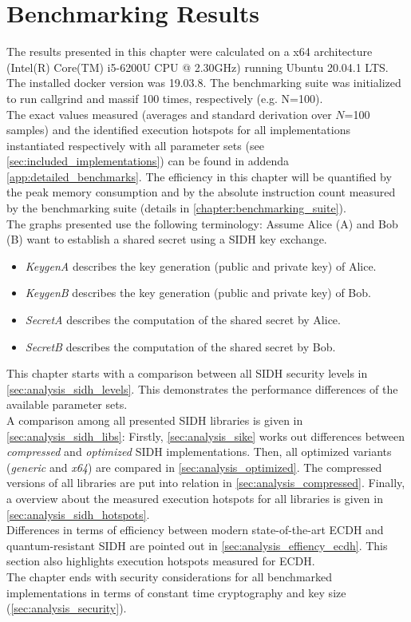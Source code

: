 \chapter{Benchmarking Results}\label{chapter:analysis}

The results presented in this chapter were calculated on a x64 architecture (Intel(R) Core(TM) i5-6200U CPU @ 2.30GHz) running Ubuntu 20.04.1 LTS. The installed docker version was 19.03.8. The benchmarking suite was initialized to run callgrind and massif 100 times, respectively (e.g. N=100).\\
The exact values measured (averages and standard derivation over $N$=100 samples) and the identified execution hotspots for all implementations instantiated respectively with all parameter sets (see \autoref{sec:included_implementations}) can be found in addenda \ref{app:detailed_benchmarks}. The efficiency in this chapter will be quantified by the peak memory consumption and by the absolute instruction count measured by the benchmarking suite (details in \autoref{chapter:benchmarking_suite}). \\
The graphs presented use the following terminology:
Assume Alice (A) and Bob (B) want to establish a shared secret using a SIDH key exchange.
\begin{itemize}
\item \textit{KeygenA} describes the key generation (public and private key) of Alice.
\item \textit{KeygenB} describes the key generation (public and private key) of Bob.
\item \textit{SecretA} describes the computation of the shared secret by Alice.
\item \textit{SecretB} describes the computation of the shared secret by Bob.
\end{itemize}
This chapter starts with a comparison between all SIDH security levels in \autoref{sec:analysis_sidh_levels}. This demonstrates the performance differences of the available parameter sets. \\
A comparison among all presented SIDH libraries is given in \autoref{sec:analysis_sidh_libs}: Firstly, \ref{sec:analysis_sike} works out differences between \textit{compressed} and \textit{optimized} SIDH implementations. Then, all optimized variants (\textit{generic} and \textit{x64}) are compared in \ref{sec:analysis_optimized}. The compressed versions of all libraries are put into relation in \ref{sec:analysis_compressed}. Finally, a overview about the measured execution hotspots for all libraries is given in \ref{sec:analysis_sidh_hotspots}.\\
Differences in terms of efficiency between modern state-of-the-art ECDH and quantum-resistant SIDH are pointed out in \autoref{sec:analysis_effiency_ecdh}. This section also highlights execution hotspots measured for ECDH.\\
The chapter ends with security considerations for all benchmarked implementations in terms of constant time cryptography and key size (\autoref{sec:analysis_security}). 

